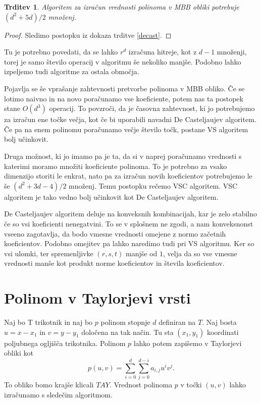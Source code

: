 \documentclass{article}
\newtheorem{trditev}{Trditev}[section]
\begin{document}
\begin{trditev}
Algoritem za izračun vrednosti polinoma v MBB obliki potrebuje $(d^2+5d)/2$ množenj.
\end{trditev}
\begin{proof}
Sledimo postopku iz dokaza trditve \ref{decast}.
\end{proof}
Tu je potrebno povedati, da se lahko $r^d$ izračuna hitreje, kot z $d-1$ množenji, torej je samo število operacij v algoritmu še nekoliko manjše. Podobno lahko izpeljemo tudi algoritme za ostala območja.


\vspace{3mm}

Pojavlja se še vprašanje zahtevnosti pretvorbe polinoma v MBB obliko. Če se lotimo naivno in na novo poračunamo vse koeficiente, potem nas ta postopek stane $O(d^3)$ operacij. To povzroči, da je časovna zahtevnost, ki jo potrebujemo za izračun ene točke večja, kot če bi uporabili navadni De Casteljaujev algoritem. Če pa na enem polinomu poračunamo večje število točk, postane VS algoritem bolj učinkovit.

Druga možnost, ki jo imamo pa je ta, da si v naprej poračunamo vrednosti s katerimi moramo množiti koeficiente polinoma. To je potrebno za vsako dimenzijo storiti le enkrat, nato pa za izračun novih koeficientov potrebujemo le še $(d^2+3d-4)/2$ množenj. Temu postopku rečemo VSC algoritem. VSC algoritem je tako vedno bolj učinkovit kot De Casteljaujev algoritem.

De Casteljaujev algoritem deluje na konveksnih kombinacijah, kar je zelo stabilno če so vsi koeficienti nenegatvini. To se v splošnem ne zgodi, a nam konveksnonst vseeno zagotavlja, da bodo vmesne vrednosti omejene z normo začetnih koeficientov. Podobno omejitev pa lahko naredimo tudi pri VS algoritmu. Ker so vsi ulomki, ter spremenljivke $(r,s,t)$ manjše od $1$, velja da so vse vmesne vrednosti manše kot produkt norme koeficientov in števila koeficientov.

\section{Polinom v Taylorjevi vrsti}

Naj bo T trikotnik in naj bo $p$ polinom stopnje $d$ definiran na $T$. Naj bosta $u = x-x_1$ in $v = y-y_1$ določena na tak način. Tu sta $(x_1,y_1)$ koordinati poljubnega ogljišča trikotnika. Polinom $p$ lahko potem zapišemo v Taylorjevi obliki kot 
$$p(u,v) = \sum_{i = 0}^d{\sum_{j=0}^{d-i}{a_{i,j}u^iv^j }}.$$To obliko bomo krajše klicali $TAY$.  Vrednost polinoma $p$ v točki $(u,v)$ lahko izračunamo s sledečim algoritmom.
\end{document}
